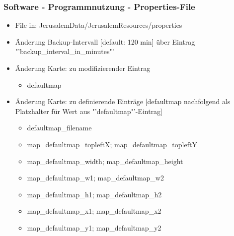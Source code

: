 \documentclass{beamer}
\begin{document}
	\begin{frame}
			\frametitle{Software - Programmnutzung - Properties-File} 
				\begin{itemize}	
					\item File in: JerusalemData/JerusalemResources/properties
					\item Änderung Backup-Intervall [default: 120 min] über Eintrag "'backup\_interval\_in\_minutes"'
					\item Änderung Karte: zu modifizierender Eintrag
					\begin{itemize}
						\item defaultmap
					\end{itemize}
					\item Änderung Karte: zu definierende Einträge [defaultmap nachfolgend als Platzhalter für Wert aus "'defaultmap"'-Eintrag]
					\begin{itemize}
						\item defaultmap\_filename
						\item map\_defaultmap\_topleftX; map\_defaultmap\_topleftY
						\item map\_defaultmap\_width; map\_defaultmap\_height
						\item map\_defaultmap\_w1; map\_defaultmap\_w2
						\item map\_defaultmap\_h1; map\_defaultmap\_h2
						\item map\_defaultmap\_x1; map\_defaultmap\_x2 
						\item map\_defaultmap\_y1; map\_defaultmap\_y2
					\end{itemize}
				\end{itemize}
	\end{frame}	
	
\end{document}
